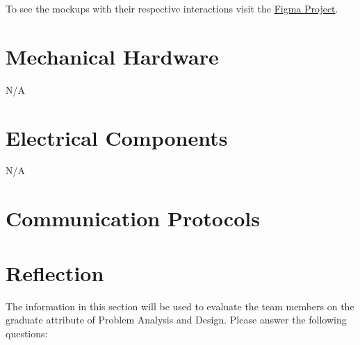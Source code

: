 \documentclass[12pt, titlepage]{article}
\begin{document}
To see the mockups with their respective interactions visit the \href{https://www.figma.com/file/58wCxZa5xulKIIYw8eX8Pr/REACH-Trial-Functionality?type=design&node-id=0%3A1&mode=design&t=ff0O5TWpZokg19Q8-1}{Figma Project}.
\section{Mechanical Hardware}

N/A

\section{Electrical Components}

N/A

\section{Communication Protocols}

\section{Reflection}

The information in this section will be used to evaluate the team members on the
graduate attribute of Problem Analysis and Design.  Please answer the following questions:
\end{document}
